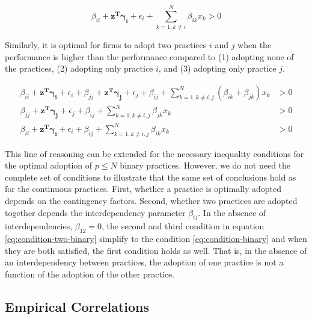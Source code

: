 \documentclass[12pt]{article}
\begin{document}
\begin{equation} \label{eq:condition-binary}
    \beta_{ii} + \mathbf{z^T} \mathbf{\gamma_i} + \epsilon_i 
    + \sum^{N}_{k = 1, k \neq i} \beta_{ik} x_k > 0
\end{equation}

Similarly, it is optimal for firms to adopt two practices $i$ and $j$ when the performance is higher than the performance compared to (1) adopting none of the practices, (2) adopting only practice $i$, and (3) adopting only practice $j$. 

\begin{equation} \label{eq:condition-two-binary}
    \begin{aligned}
        \beta_{ii} + \mathbf{z^T} \mathbf{\gamma_i} + \epsilon_i
        + \beta_{jj} + \mathbf{z^T} \mathbf{\gamma_j} + \epsilon_j
        + \beta_{ij} + \sum^{N}_{k = 1, k \neq i,j} (\beta_{ik} + \beta_{jk}) x _k &> 0 \\
        \beta_{jj} + \mathbf{z^T} \mathbf{\gamma_j} + \epsilon_j 
        + \beta_{ij} + \sum^{N}_{k = 1, k \neq i,j} \beta_{jk} x_k &> 0 \\
        \beta_{ii} + \mathbf{z^T} \mathbf{\gamma_i} + \epsilon_i
        + \beta_{ij} + \sum^{N}_{k = 1, k \neq i,j} \beta_{ik} x_k &> 0 
    \end{aligned} 
\end{equation}

This line of reasoning can be extended for the necessary inequality conditions for the optimal adoption of $p \leq N$ binary practices. However, we do not need the complete set of conditions to illustrate that the same set of conclusions hold as for the continuous practices. First, whether a practice is optimally adopted depends on the contingency factors. Second, whether two practices are adopted together depends the interdependency parameter $\beta_{ij}$. In the absence of interdependencies, $\beta_{12} = 0$, the second and third condition in equation \eqref{eq:condition-two-binary} simplify to the condition \eqref{eq:condition-binary} and when they are both satisfied, the first condition holds as well. That is, in the absence of an interdependency between practices, the adoption of one practice is not a function of the adoption of the other practice.

\subsection{Empirical Correlations}
\end{document}
